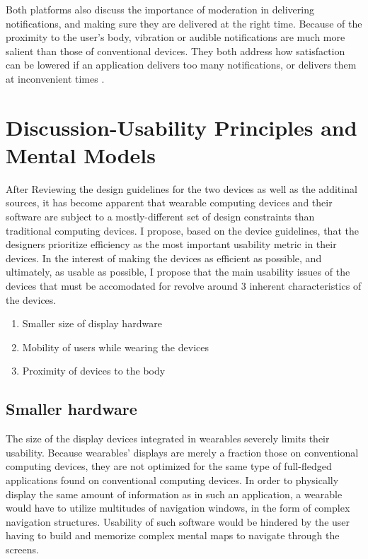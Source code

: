 \documentclass[12pt]{article}
\begin{document}
Both platforms also discuss the importance of moderation in delivering notifications, and making sure they are delivered at the right time. Because of the proximity to the user's body, vibration or audible notifications are much more salient than those of conventional devices. They both address how satisfaction can be lowered if an application delivers too many notifications, or delivers them at inconvenient times \cite{goog} \cite{andr}.

\section{Discussion-Usability Principles and Mental Models}
After Reviewing the design guidelines for the two devices as well as the additinal sources, it has become apparent that wearable computing devices and their software are subject to a mostly-different set of design constraints than traditional computing devices. I  propose, based on the device guidelines, that the designers prioritize efficiency as the most important usability metric in their devices. In the interest of making the devices as efficient as possible, and ultimately, as usable as possible, I propose that the main usability issues of the devices that must be accomodated for revolve around 3 inherent characteristics of the devices.

\begin{enumerate}
\item{Smaller size of display hardware}
\item{Mobility of users while wearing the devices}
\item{Proximity of devices to the body}
\end{enumerate}

\subsection{Smaller hardware}
The size of the display devices integrated in wearables severely limits their usability. Because wearables' displays are merely a fraction those on conventional computing devices, they are not optimized for the same type of full-fledged applications found on conventional computing devices. In order to physically display the same amount of information as in such an application, a wearable would have to utilize multitudes of navigation windows, in the form of complex navigation structures. Usability of such software would be hindered by the user having to build and memorize complex mental maps to navigate through the screens.
\end{document}
